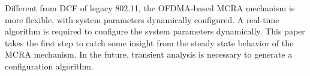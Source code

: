 \documentclass[journal]{IEEEtran}
\begin{document}
Different from DCF of legacy 802.11, the OFDMA-based MCRA mechanism is more flexible, with system parameters dynamically configured.
A real-time algorithm is required to configure the system parameters dynamically. 
This paper takes the first step to catch some insight from the steady state behavior of the MCRA mechanism.
In the future, transient analysis is necessary to generate a configuration algorithm.



%
%
\end{document}
